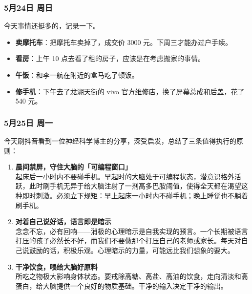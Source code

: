 \subsubsection{5月24日 周日}

今天事情还挺多的，记录一下。

\begin{itemize}
  \item \textbf{卖摩托车}：把摩托车卖掉了，成交价 3000 元。下周三才能办过户手续。
  \item \textbf{看房}：上午 10 点去看了租的房子，应该是在考虑搬家的事情。
  \item \textbf{午饭}：和李一航在附近的盒马吃了顿饭。
  \item \textbf{修手机}：下午去了龙湖天街的 vivo 官方维修店，换了屏幕总成和后盖，花了 540 元。
\end{itemize}

\subsubsection{5月25日 周一}

\begin{personalnote}

今天刷抖音看到一位神经科学博主的分享，深受启发，总结了三条值得执行的原则：

\begin{enumerate}
  \item \textbf{晨间禁屏，守住大脑的「可编程窗口」} \\
  起床后一小时内不要碰手机。早起时的大脑处于可编程状态，潜意识格外活跃，此时刷手机无异于给大脑注射了一剂高多巴胺阈值，使得全天都在渴望这种即时刺激。必须立下规矩：早上起床一小时内不碰手机；晚上睡觉也不躺着刷手机。

  \item \textbf{对着自己说好话，语言即是暗示} \\
  念念不忘，必有回响——消极的心理暗示是自我实现的预言。一个长期被语言打压的孩子必然长不好，而我们不要做那个打压自己的老师或家长。每天对自己说鼓励的话，积极乐观。心理暗示的力量，可能远比我们想象的要大。

  \item \textbf{干净饮食，喂给大脑好原料} \\
  所吃之物极大影响身体状态。要戒除高糖、高盐、高油的饮食，走向清淡和高蛋白，给大脑提供一个良好的物质基础。干净的输入决定干净的输出。
\end{enumerate}

\end{personalnote}

